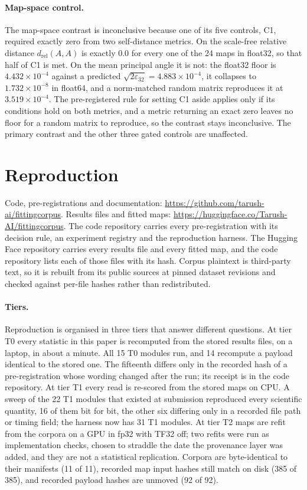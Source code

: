 \documentclass{article}
\begin{document}
\paragraph{Map-space control.} The map-space contrast is inconclusive because one of its five
controls, C1, required exactly zero from two self-distance metrics. On the scale-free relative
distance $d_{\mathrm{rel}}(A,A)$ is exactly $0.0$ for every one of the 24 maps in float32, so that
half of C1 is met. On the mean principal angle it is not: the float32 floor is $4.432\times10^{-4}$
against a predicted $\sqrt{2\varepsilon_{32}}=4.883\times10^{-4}$, it collapses to
$1.732\times10^{-8}$ in float64, and a norm-matched random matrix reproduces it at
$3.519\times10^{-4}$. The pre-registered rule for setting C1 aside applies only if its conditions hold on both metrics,
and a metric returning an exact zero leaves no floor for a random matrix to reproduce, so the
contrast stays inconclusive. The primary contrast and the other three gated controls are
unaffected.

\section{Reproduction}
\label{app:repro}

Code, pre-registrations and documentation: \url{https://github.com/tarush-ai/fittingcorpus}.
Results files and fitted maps: \url{https://huggingface.co/Tarush-AI/fittingcorpus}.
The code repository carries every pre-registration with its decision rule, an experiment registry
and the reproduction harness. The Hugging Face repository carries every results file and every
fitted map, and the code repository lists each of those files with its hash. Corpus plaintext is
third-party text, so it is rebuilt from its public sources at pinned dataset revisions and checked
against per-file hashes rather than redistributed.

\paragraph{Tiers.} Reproduction is organised in three tiers that answer different questions. At
tier T0 every statistic in this paper is recomputed from the stored results files, on a laptop, in
about a minute. All 15 T0 modules run, and 14 recompute a payload identical to the stored one. The
fifteenth differs only in the recorded hash of a pre-registration whose wording changed after the
run; its receipt is in the code repository. At tier T1 every read is
re-scored from the stored maps on CPU. A sweep of the 22 T1 modules that existed at submission
reproduced every scientific quantity, 16 of them bit for bit, the other six differing only in a
recorded file path or timing field; the harness now has 31 T1 modules. At tier T2 maps are refit
from the corpora on a GPU in fp32 with TF32 off; two refits were run as implementation checks,
chosen to straddle the date the provenance layer was added, and they are not a statistical
replication. Corpora are byte-identical to their manifests (11 of 11), recorded map input hashes
still match on disk (385 of 385), and recorded payload hashes are unmoved (92 of 92).
\end{document}
